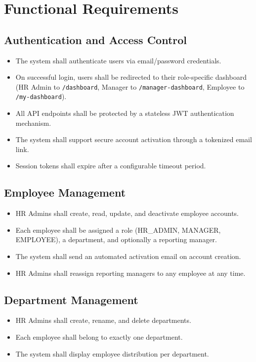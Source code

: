 \documentclass[12pt,a4paper]{report}
\begin{document}
\section{Functional Requirements}

\subsection{Authentication and Access Control}
\begin{itemize}
  \item The system shall authenticate users via email/password credentials.
  \item On successful login, users shall be redirected to their role-specific dashboard
    (HR Admin to \texttt{/dashboard}, Manager to \texttt{/manager-dashboard}, Employee
    to \texttt{/my-dashboard}).
  \item All API endpoints shall be protected by a stateless JWT authentication mechanism.
  \item The system shall support secure account activation through a tokenized email link.
  \item Session tokens shall expire after a configurable timeout period.
\end{itemize}

\subsection{Employee Management}
\begin{itemize}
  \item HR Admins shall create, read, update, and deactivate employee accounts.
  \item Each employee shall be assigned a role (HR\_ADMIN, MANAGER, EMPLOYEE),
    a department, and optionally a reporting manager.
  \item The system shall send an automated activation email on account creation.
  \item HR Admins shall reassign reporting managers to any employee at any time.
\end{itemize}

\subsection{Department Management}
\begin{itemize}
  \item HR Admins shall create, rename, and delete departments.
  \item Each employee shall belong to exactly one department.
  \item The system shall display employee distribution per department.
\end{itemize}
\end{document}
